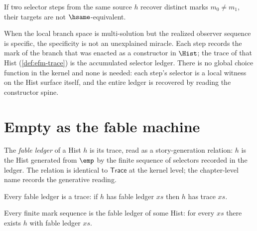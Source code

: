 \begin{theorem}
\label{thm:efm-distinct-branches-separated}
If two selector steps from the same source $h$ recover distinct marks $m_0 \neq m_1$, their targets are not $\hsame$-equivalent.
\end{theorem}

\begin{remark}
\label{rem:efm-specific-sequence-ledger}
When the local branch space is multi-solution but the realized observer sequence is specific, the specificity is not an unexplained miracle. Each step records the mark of the branch that was enacted as a constructor in $\Hist$; the trace of that Hist (\autoref{def:efm-trace}) is the accumulated selector ledger. There is no global choice function in the kernel and none is needed: each step's selector is a local witness on the Hist surface itself, and the entire ledger is recovered by reading the constructor spine.
\end{remark}

\section{Empty as the fable machine}
\label{sec:efm-fable-machine}

\begin{definition}
\label{def:efm-fable-ledger}
The \emph{fable ledger} of a Hist $h$ is its trace, read as a story-generation relation: $h$ is the Hist generated from $\emp$ by the finite sequence of selectors recorded in the ledger. The relation is identical to $\mathsf{Trace}$ at the kernel level; the chapter-level name records the generative reading.
\end{definition}

\begin{theorem}
\label{thm:efm-fable-sound}
Every fable ledger is a trace: if $h$ has fable ledger $xs$ then $h$ has trace $xs$.
\end{theorem}

\begin{theorem}
\label{thm:efm-fable-complete}
Every finite mark sequence is the fable ledger of some Hist: for every $xs$ there exists $h$ with fable ledger $xs$.
\end{theorem}

